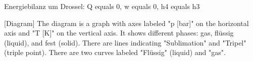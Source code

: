 Energiebilanz um Drossel:  
Q equals 0, w equals 0, h4 equals h3

[Diagram]  
The diagram is a graph with axes labeled "p [bar]" on the horizontal axis and "T [K]" on the vertical axis. It shows different phases: gas, flüssig (liquid), and fest (solid). There are lines indicating "Sublimation" and "Tripel" (triple point). There are two curves labeled "Flüssig" (liquid) and "gas".